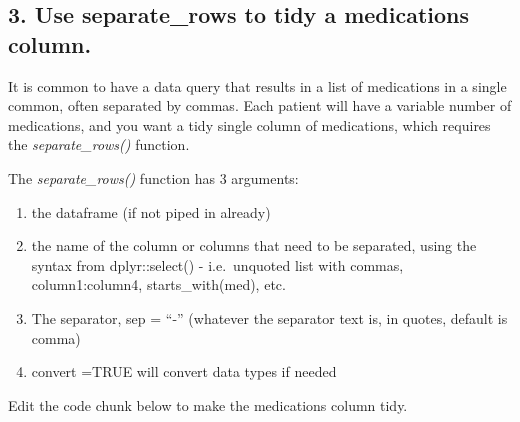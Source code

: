 \documentclass[
]{book}
\newenvironment{Shaded}{\begin{snugshade}}{\end{snugshade}}
\newcommand{\DataTypeTok}[1]{\textcolor[rgb]{0.13,0.29,0.53}{#1}}
\newcommand{\DecValTok}[1]{\textcolor[rgb]{0.00,0.00,0.81}{#1}}
\newcommand{\KeywordTok}[1]{\textcolor[rgb]{0.13,0.29,0.53}{\textbf{#1}}}
\newcommand{\NormalTok}[1]{#1}
\newcommand{\OperatorTok}[1]{\textcolor[rgb]{0.81,0.36,0.00}{\textbf{#1}}}
\newcommand{\StringTok}[1]{\textcolor[rgb]{0.31,0.60,0.02}{#1}}
\providecommand{\tightlist}{%
  \setlength{\itemsep}{0pt}\setlength{\parskip}{0pt}}
\begin{document}
\hypertarget{use-separate_rows-to-tidy-a-medications-column.}{%
\subsection{3. Use separate\_rows to tidy a medications column.}\label{use-separate_rows-to-tidy-a-medications-column.}}

It is common to have a data query that results in a list of medications in a single common, often separated by commas.
Each patient will have a variable number of medications, and you want a tidy single column of medications, which requires the \emph{separate\_rows()} function.

The \emph{separate\_rows()} function has 3 arguments:

\begin{enumerate}
\def\labelenumi{\arabic{enumi}.}
\tightlist
\item
  the dataframe (if not piped in already)
\item
  the name of the column or columns that need to be separated, using the syntax from dplyr::select() - i.e.~unquoted list with commas, column1:column4, starts\_with(med), etc.
\item
  The separator, sep = ``-'' (whatever the separator text is, in quotes, default is comma)
\item
  convert =TRUE will convert data types if needed 
\end{enumerate}

Edit the code chunk below to make the medications column tidy.

\begin{Shaded}
\end{Shaded}
\end{document}

